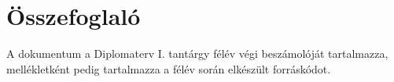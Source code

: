 \chapter*{Összefoglaló}

A dokumentum a Diplomaterv I. tantárgy félév végi beszámolóját tartalmazza, mellékletként pedig tartalmazza a félév során elkészült forráskódot.